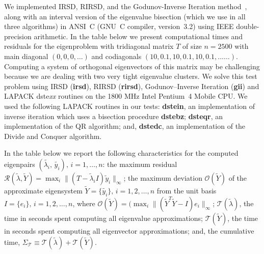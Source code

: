 \documentclass{report}
\begin{document}
We implemented IRSD, RIRSD, and the Godunov-Inverse Iteration
method~\cite{matsekh_imacs}, along with an interval version of
the eigenvalue bisection (which we use in all three algorithms)
in ANSI~C (GNU~C compiler, version~3.2) using IEEE
double-precision arithmetic. In the table below we present
computational times and residuals for the eigenproblem with
tridiagonal matrix $T$ of size $n=2500$ with main diagonal $(0,
0, 0, \ldots)$ and codiagonals $(10, 0.1, 10, 0.1, 10, 0.1,
...\ldots)$. Computing a system of orthogonal eigenvectors of
this matrix may be challenging because we are dealing with two very
tight eigenvalue clusters. We solve this test problem using
IRSD (\textbf{irsd}), RIRSD (\textbf{rirsd}),
Godunov--Inverse Iteration (\textbf{gii}) and
LAPACK dste\emph{xx} routines on the 1800 MHz
Intel\textregistered{} Pentium~4 Mobile\textregistered{} CPU\@.
We used the following LAPACK routines in our tests:
\textbf{dstein}, an implementation of inverse iteration which
uses a bisection procedure \textbf{dstebz};
\textbf{dsteqr}, an implementation of the QR algorithm; and,
\textbf{dstedc}, an implementation of the Divide and Conquer algorithm.

In the table below we report the following characteristics for
the computed eigenpairs
$(\tilde{\lambda_i},\,\tilde{y_i}),\,i=1,\ldots, n$: the maximum
residual $\mathcal{R}(\tilde{\lambda}, \tilde{Y}) = \max_i \| (T
- \tilde{\lambda}_i I) \tilde{y}_i \|_\infty$; the maximum
deviation $\mathcal{O}(\tilde{Y})$ of the approximate eigensystem
$\tilde{Y} = \{\tilde{y_i}\},\, i = 1, 2, \ldots, n$ from the unit basis
$I = \{e_i\},\, i = 1, 2,\ldots, n$, where
$\mathcal{O}(\tilde{Y})=(\max_i \|(\tilde{Y}^T \tilde{Y} - I)
e_i\|_\infty$; $\mathcal{T}( \tilde{\lambda})$, the time in seconds spent
computing all eigenvalue
approximations; $\mathcal{T}( \tilde{Y})$, the time in seconds
spent computing all eigenvector approximations; and, the
cumulative time, $\Sigma_{\mathcal{T}} \equiv
\mathcal{T}(\tilde{\lambda}) + \mathcal{T}( \tilde{Y})$.

\begin{table}[hbtp]
\centering
{}
\label{tbl:TestNew}
\end{table}
\end{document}
